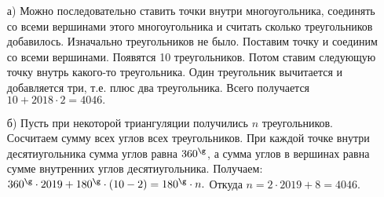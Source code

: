 \solutionSection
\begin{enumerate}
    \item [а)] Можно последовательно ставить точки внутри многоугольника, соединять со всеми вершинами этого многоугольника и считать сколько треугольников добавилось. Изначально треугольников не было. Поставим точку и соединим со всеми вершинами. Появятся 10 треугольников. Потом ставим следующую точку внутрь какого-то треугольника. Один треугольник вычитается и добавляется три, т.е. плюс два треугольника. Всего получается $10+2018\cdot2=4046.$
    
    \item [б)] Пусть при некоторой триангуляции получились $n$ треугольников. Сосчитаем сумму всех углов всех треугольников. При каждой точке внутри десятиугольника сумма углов равна $360^\g$, а сумма углов в вершинах равна сумме внутренних углов десятиугольника. Получаем: $360^\g\cdot 2019+180^\g\cdot (10-2)=180^\g\cdot n.$ Откуда $n=2\cdot2019+8=4046.$ 
\end{enumerate}




